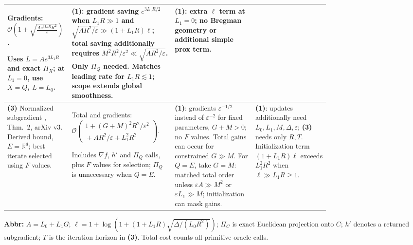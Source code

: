 \begin{table}[tp]
\begin{threeparttable}
\begin{tabularx}{\linewidth}{@{}>{\raggedright\arraybackslash}p{0.20\linewidth}>{\raggedright\arraybackslash}p{0.32\linewidth}>{\raggedright\arraybackslash}p{0.25\linewidth}>{\raggedright\arraybackslash}X@{}}
\par Gradients: $\mathcal{O}\!\left(1+\sqrt{\frac{Ae^{3L_1R}R^2}{\varepsilon}}\right)$.
\par Uses $L=Ae^{3L_1R}$ and exact $\Pi_X$; at $L_1=0$, use $X=Q$, $L=L_0$.
& \textbf{(1)}: gradient saving $e^{3L_1R/2}$ when $L_1R\gg1$ and $\sqrt{AR^2/\varepsilon}\gg(1+L_1R)\ell$; total saving additionally requires $M^2R^2/\varepsilon^2\ll\sqrt{AR^2/\varepsilon}$. Only $\Pi_Q$ needed. Matches leading rate for $L_1R\lesssim1$; scope extends global smoothness.
& \textbf{(1)}: extra $\ell$ term at $L_1=0$; no Bregman geometry or additional simple prox term. \\
\midrule
\textbf{(3)} Normalized subgradient \citep{sgsGrimmer2019}, Thm.~2, arXiv v3. Derived bound, $E=\mathbb R^d$; best iterate selected using $F$ values.
& Total and gradients:
$\mathcal{O}\!\left(\begin{gathered}1+(G+M)^2R^2/\varepsilon^2\\{}+AR^2/\varepsilon+L_1^2R^2\end{gathered}\right)$.
\par Includes $\nabla f$, $h'$ and $\Pi_Q$ calls, plus $F$ values for selection; $\Pi_Q$ is unnecessary when $Q=E$.
& \textbf{(1)}: gradients $\varepsilon^{-1/2}$ instead of $\varepsilon^{-2}$ for fixed parameters, $G+M>0$; no $F$ values. Total gains can occur for constrained $G\gg M$. For $Q=E$, take $G=M$: matched total order unless $\varepsilon A\gg M^2$ or $\varepsilon L_1\gg M$; initialization can mask gains.
& \textbf{(1)}: updates additionally need $L_0,L_1,M,\Delta,\varepsilon$; \textbf{(3)} needs only $R,T$. Initialization term $(1+L_1R)\ell$ exceeds $L_1^2R^2$ when $\ell\gg L_1R\ge1$. \\
\bottomrule
\end{tabularx}
\begin{tablenotes}[flushleft]\footnotesize
\item[] \textbf{Abbr:} $A=L_0+L_1G$; $\ell=1+\log\!\left(1+(1+L_1R)\sqrt{\Delta/(L_0R^2)}\right)$; $\Pi_C$ is exact Euclidean projection onto $C$; $h'$ denotes a returned subgradient; $T$ is the iteration horizon in \textbf{(3)}. Total cost counts all primitive oracle calls.
\end{tablenotes}
\end{threeparttable}
\end{table}
\clearpage
